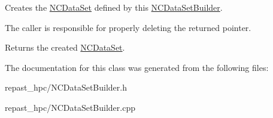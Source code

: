 Creates the \hyperlink{classrepast_1_1_n_c_data_set}{N\-C\-Data\-Set} defined by this \hyperlink{classrepast_1_1_n_c_data_set_builder}{N\-C\-Data\-Set\-Builder}. 

The caller is responsible for properly deleting the returned pointer.

\begin{DoxyReturn}{Returns}
the created \hyperlink{classrepast_1_1_n_c_data_set}{N\-C\-Data\-Set}. 
\end{DoxyReturn}


The documentation for this class was generated from the following files\-:\begin{DoxyCompactItemize}
\item 
repast\-\_\-hpc/N\-C\-Data\-Set\-Builder.\-h\item 
repast\-\_\-hpc/N\-C\-Data\-Set\-Builder.\-cpp\end{DoxyCompactItemize}
